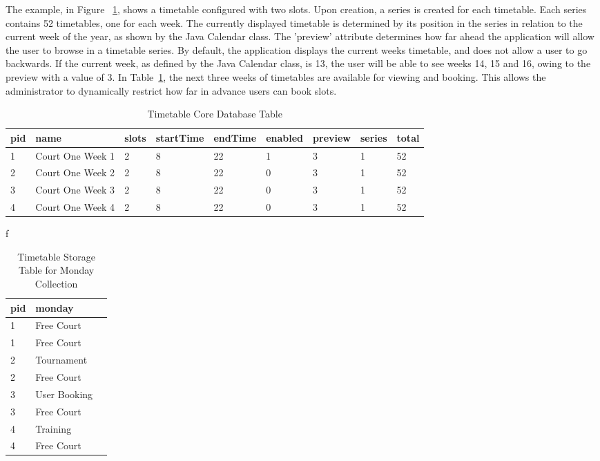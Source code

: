 The example, in Figure ~\ref{fig:ttdb}, shows a timetable configured with two slots. Upon creation, a series is created for each timetable. Each series contains 52 timetables, one for each week. The currently displayed timetable is determined by its position in the series in relation to the current week of the year, as shown by the Java Calendar class. The 'preview' attribute determines how far ahead the application will allow the user to browse in a timetable series. By default, the application displays the current weeks timetable, and does not allow a user to go backwards. If the current week, as defined by the Java Calendar class, is 13, the user will be able to see weeks 14, 15 and 16, owing to the preview with a value of 3. In Table~\ref{fig:ttdb}, the next three weeks of timetables are available for viewing and booking. This allows the administrator to dynamically restrict how far in advance users can book slots.

\begin{table}[H]
	\caption{Timetable Core Database Table}
    \begin{tabular}{| l | l | l | l | l | l | l | l | p{.8cm} |}
    \hline
    pid & name & slots & startTime & endTime & enabled & preview & series & total\\ \hline
    1 & Court One Week 1 & 2 & 8 & 22 & 1 & 3 & 1 & 52\\ \hline
	2 & Court One Week 2 & 2 & 8 & 22 & 0 & 3 & 1 & 52\\ \hline
	3 & Court One Week 3 & 2 & 8 & 22 & 0 & 3 & 1 & 52\\ \hline
	4 & Court One Week 4 & 2 & 8 & 22 & 0 & 3 & 1 & 52\\ \hline
    \end{tabular}

	\label{fig:ttdb}
\end{table}

\begin{table}[H]f
	\caption{Timetable Storage Table for Monday Collection}
\begin {center}
    \begin{tabular}{| l | l | p{.8cm} |}
	\hline
	pid & monday \\ \hline
	1 & Free Court \\ \hline
	1 & Free Court \\ \hline
	2 & Tournament \\ \hline
	2 & Free Court \\ \hline
	3 & User Booking \\ \hline
	3 & Free Court \\ \hline
	4 & Training \\ \hline
	4 & Free Court \\ \hline
	\end{tabular}
	\end{center}
\end{table}

